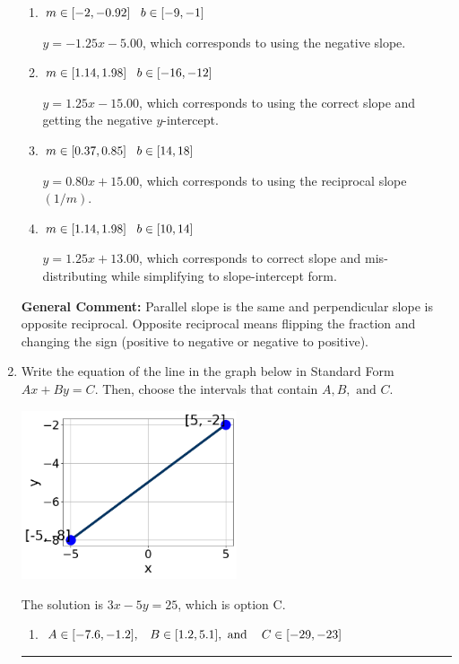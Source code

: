 \documentclass{extbook}[14pt]
\newcommand{\litem}[1]{\item #1

\rule{\textwidth}{0.4pt}}
\begin{document}
\begin{enumerate}
{\begin{enumerate}[label=\Alph*.]
* $y = 1.25x + 15.00$, which is the correct option.
\item \( m \in [-2, -0.92] \hspace*{3mm} b \in [-9, -1] \)

 $y = -1.25x - 5.00$, which corresponds to using the negative slope.
\item \( m \in [1.14, 1.98] \hspace*{3mm} b \in [-16, -12] \)

 $y = 1.25x - 15.00$, which corresponds to using the correct slope and getting the negative $y$-intercept.
\item \( m \in [0.37, 0.85] \hspace*{3mm} b \in [14, 18] \)

 $y = 0.80x + 15.00$, which corresponds to using the reciprocal slope $(1/m)$.
\item \( m \in [1.14, 1.98] \hspace*{3mm} b \in [10, 14] \)

 $y = 1.25x + 13.00$, which corresponds to correct slope and mis-distributing while simplifying to slope-intercept form.
\end{enumerate}

\textbf{General Comment:} Parallel slope is the same and perpendicular slope is opposite reciprocal. Opposite reciprocal means flipping the fraction and changing the sign (positive to negative or negative to positive).
}
\litem{
Write the equation of the line in the graph below in Standard Form $Ax+By=C$. Then, choose the intervals that contain $A, B, \text{ and } C$.

\begin{center}
    \includegraphics[width=0.5\textwidth]{../Figures/linearGraphToStandardC.png}
\end{center}


The solution is \( 3x - 5y = 25 \), which is option C.\begin{enumerate}[label=\Alph*.]
\item \( A \in [-7.6, -1.2], \hspace{3mm} B \in [1.2, 5.1], \text{ and } \hspace{3mm} C \in [-29, -23] \)


\end{enumerate}}
\end{enumerate}
\end{document}
